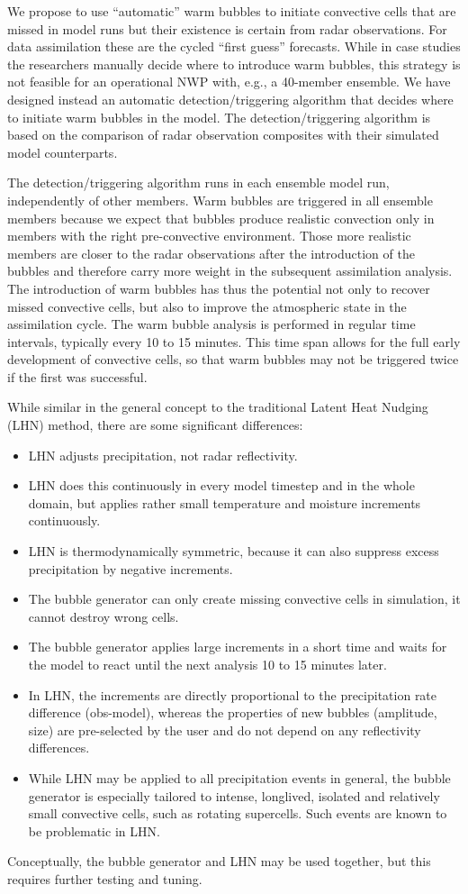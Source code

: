 \documentclass[10pt,a4paper,twoside,headinclude,footinclude,parskip=half]{scrartcl}
\begin{document}
We propose to use ``automatic'' warm bubbles to initiate convective cells that are missed in model runs 
but their existence is certain from radar observations. For data assimilation these are the cycled ``first guess'' forecasts.
While in case studies the researchers manually decide where to introduce warm bubbles,
this strategy is not feasible for an operational NWP with, e.g., a 40-member ensemble.
We have designed instead an automatic detection/triggering algorithm that decides where to initiate warm bubbles in the model.
The detection/triggering algorithm is based on the comparison of radar observation composites with their  simulated model counterparts.

The detection/triggering algorithm runs in each ensemble model run, independently of other members.
Warm bubbles are triggered in all ensemble members because we expect that bubbles produce realistic
convection only in members with the right pre-convective environment.
Those more realistic members are closer to the radar observations after the introduction of the bubbles and therefore
carry more weight in the subsequent assimilation analysis.
The introduction of warm bubbles has thus the potential not only to recover missed convective cells,
but also to improve the atmospheric state in the assimilation cycle.
The warm bubble analysis is performed in regular time intervals, typically every 10 to 15 minutes. This time span allows for the full early development of convective cells,
so that warm bubbles may not be triggered twice if the first was successful.

While similar in the general concept to the traditional Latent Heat Nudging (LHN) method, there are some significant differences:
\begin{itemize}
\item LHN adjusts precipitation, not radar reflectivity.
\item LHN does this continuously in every model timestep and in the whole domain, but applies rather small temperature and moisture increments continuously.
\item LHN is thermodynamically symmetric, because it can also suppress excess precipitation by negative increments.
\item The bubble generator can only create missing convective cells in simulation, it cannot destroy wrong cells.
\item The bubble generator applies large increments in a short time and waits for the model to react until the next analysis 10 to 15 minutes later.
\item In LHN, the increments are directly proportional to the precipitation rate difference (obs-model), whereas
  the properties of new bubbles (amplitude, size) are pre-selected by the user and do not depend on any reflectivity differences.
\item While LHN may be applied to all precipitation events in general, the bubble generator is especially tailored to
  intense, longlived, isolated and relatively small convective cells, such as rotating supercells. Such events are known
  to be problematic in LHN.
\end{itemize}
Conceptually, the bubble generator and LHN may be used together, but this requires further testing and tuning.
\end{document}
